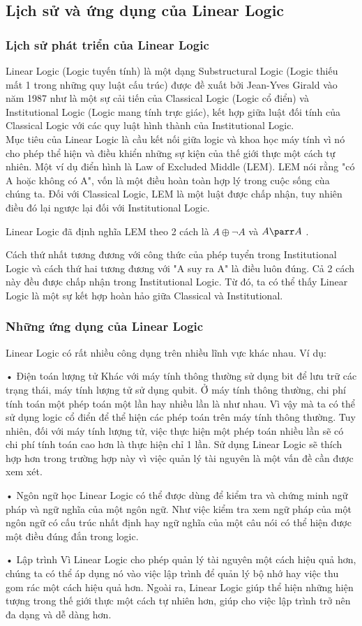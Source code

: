 \subsection{Lịch sử và ứng dụng của Linear Logic}
\subsubsection{Lịch sử phát triển của Linear Logic}
Linear Logic (Logic tuyến tính) là một dạng Substructural Logic (Logic thiếu mất 1 trong những quy luật cấu trúc) được đề xuất bởi Jean-Yves Girald vào năm 1987 như là một sự cải tiến của Classical Logic (Logic cổ điển) và Institutional Logic (Logic mang tính trực giác), kết hợp giữa luật đối tính của Classical Logic với các quy luật hình thành của Institutional Logic.\\

Mục tiêu của Linear Logic là cầu kết nối giữa logic và khoa học máy tính vì nó cho phép thể hiện và điều khiển những sự kiện của thế giới thực một cách tự nhiên. Một ví dụ điển hình là Law of Excluded Middle (LEM). LEM nói rằng "có A hoặc không có A", vốn là một điều hoàn toàn hợp lý trong cuộc sống cùa chúng ta. Đối với Classical Logic, LEM là một luật được chấp nhận, tuy nhiên điều đó lại ngược lại đối với Institutional Logic. 

Linear Logic đã định nghĩa LEM theo 2 cách là $ A \oplus \neg A $ và $ A \parr  A $ .

Cách thứ nhất tương đương với công thức của phép tuyển trong Institutional Logic và cách thứ hai tương đương với "A suy ra A" là điều luôn đúng. Cả 2 cách này đều được chấp nhận trong Institutional Logic. Từ đó, ta có thể thấy Linear Logic là một sự kết hợp hoàn hảo giữa Classical và Institutional.


\subsubsection{Những ứng dụng của Linear Logic}
Linear Logic có rất nhiều công dụng trên nhiều lĩnh vực khác nhau. Ví dụ:


•	Điện toán lượng tử
Khác với máy tính thông thường sử dụng bit để lưu trữ các trạng thái, máy tính lượng tử sử dụng qubit. Ở máy tính thông thường, chi phí tính toán một phép toán một lần hay nhiều lần là như nhau. Vì vậy mà ta có thể sử dụng logic cổ điển để thể hiện các phép toán trên máy tính thông thường. Tuy nhiên, đối với máy tính lượng tử, việc thực hiện một phép toán nhiều lần sẽ có chi phí tính toán cao hơn là thực hiện chỉ 1 lần. Sử dụng Linear Logic sẽ thích hợp hơn trong trường hợp này vì việc quản lý tài nguyên là một vấn đề cần được xem xét.


•	Ngôn ngữ học
Linear Logic có thể được dùng để kiểm tra và chứng minh ngữ pháp và ngữ nghĩa của một ngôn ngữ. Như việc kiểm tra xem ngữ pháp của một ngôn ngữ có cấu trúc nhất định hay ngữ nghĩa của một câu nói có thể hiện được một điều đúng đắn trong logic.


•	Lập trình
Vì Linear Logic cho phép quản lý tài nguyên một cách hiệu quả hơn, chúng ta có thể áp dụng nó vào việc lập trình để quản lý bộ nhớ hay việc thu gom rác một cách hiệu quả hơn. Ngoài ra, Linear Logic giúp thể hiện những hiện tượng trong thế giới thực một cách tự nhiên hơn, giúp cho việc lập trình trở nên đa dạng và dễ dàng hơn.